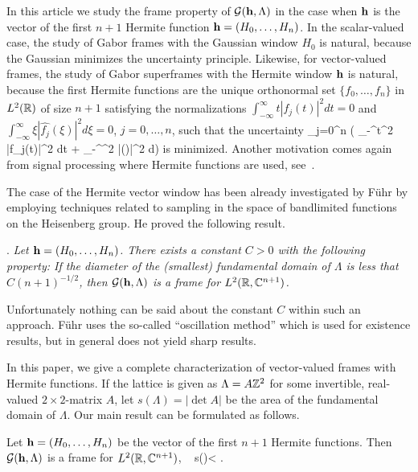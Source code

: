 \documentclass[12pt]{amsart}
\begin{document}
In this article we study the frame property of $\mathcal{G}(\mathbf {h} , \Lambda)$
in  the case when $\mathbf {h} $ is the vector of the first $n+1$   Hermite function
 $\mathbf {h} =(H_0, \dots , H_n)$. In the scalar-valued case, the study of
 Gabor frames with the Gaussian window $H_0$ is natural, because the
 Gaussian minimizes the uncertainty principle. Likewise, for
 vector-valued frames, the study of Gabor superframes with the Hermite
 window $\mathbf {h} $ is natural, because the first Hermite functions are
 the unique orthonormal set $\{f_0, \dots , f_n\}$ in $L^2(\mathbb{R} )$ of size $n+1$ 
 satisfying the normalizations $\int_{-\infty}^\infty t |f_j(t)|^2 dt
 =0$ and $ \int_{-\infty}^\infty \xi |\hat{f_j}(\xi)|^2 d\xi =0$,
 $j=0, \dots , n$,   such that  the  uncertainty 
 \beq
 \label{sum_uncertainty}
 \sum _{j=0}^n \left ( \int_{-\infty}^\infty t^2 |f_j(t)|^2 dt +
 \int_{-\infty}^\infty \xi^2 |(\xi)|^2 d\xi  \right )
 \eeq
is minimized. 
Another motivation comes again from signal processing where Hermite
functions are used,  see~\cite{matz}.   


The case of the Hermite vector window has been already investigated by
 F\"uhr by employing techniques related to sampling in the space of
bandlimited functions on the Heisenberg group.  He   proved the
following result.   

\cite{fuehr07}.  {\em Let $\mathbf {h} = (H_0 , \dots ,
  H_n)$.  There exists a constant $C>0$ 
  with the following property: If the diameter of the (smallest)
  fundamental domain of $\Lambda $ is less that $C(n+1)^{-1/2}$, then  
$\mathcal{G}(\mathbf {h},\Lambda)$ is a frame for $L^2(\mathbb{R},\mathbb{C}^{n+1})$.} 

 

 Unfortunately nothing can be said about the constant $C$ within such
 an approach. F\"uhr uses the so-called ``oscillation method'' which
 is used for existence results, but  in general does not yield sharp
 results. 

In this paper, we give  a complete characterization of vector-valued
frames with Hermite functions. If the lattice is given as $\Lambda =
A\mathbb{Z} ^2$ for some invertible, real-valued $2\times 2$-matrix $A$, let
$s(\Lambda )= |\det A |$ be the area  of the fundamental domain of
$\Lambda $. Our main result can be formulated as follows. 
 


 \begin{thm}
 \label{mainchar1}
Let $\mathbf {h} = (H_0 , \dots , H_n)$ be the vector of the first $n+1$
Hermite functions. Then   $\mathcal{G}(\mathbf {h},\Lambda)$ is   a frame for
$L^2(\mathbb{R},\mathbb{C}^{n+1})$, \fif\ 
 \beq
 \label{main_estimate}
 s(\Lambda)< .
 \eeq 
\end{thm}  
\end{document}
